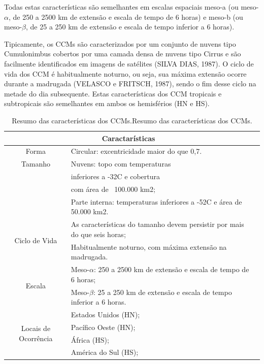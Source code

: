 Todas estas características são semelhantes em escalas espaciais meso-a (ou meso-$\alpha$, de 250 a 2500 km de extensão e escala de tempo de 6 horas) e meso-b (ou meso-$\beta$, de 25 a 250 km de extensão e escala de tempo inferior a 6 horas).

Tipicamente, os CCMs são caracterizados por um conjunto de nuvens tipo Cumulonimbus cobertos por uma camada densa de nuvens tipo Cirrus e são facilmente identificados em imagens de satélites (SILVA DIAS, 1987). O ciclo de vida dos CCM é habitualmente noturno, ou seja, sua máxima extensão ocorre durante a madrugada (VELASCO e FRITSCH, 1987), sendo o fim desse ciclo na metade do dia subsequente. Estas características dos CCM tropicais e subtropicais são semelhantes em ambos os hemisférios (HN e HS).

\begin{table}
\caption{Resumo das características dos CCMs.Resumo das características dos CCMs.}
\label{tab03}
\centering
\begin{tabular}{c|p{12cm}l}
\hline
\multicolumn{2}{c}{Caractarísticas}                                                 \\
\hline
Forma                                       & Circular: excentricidade maior do que 0,7.\\
\hline
Tamanho                                     & Nuvens: topo com temperaturas \\
                                            & inferiores a -32C e cobertura \\
                                            & com área de ~100.000 km2; \\
                                            & Parte interna: temperaturas inferiores a -52C e área de 50.000 km2.         \\
\hline
\multirow{2}{2cm}{Ciclo de Vida}            & As características do tamanho devem persistir por mais do que seis horas;   \\
                                            & Habitualmente noturno, com máxima extensão na madrugada.                \\
\hline
\multirow{2}{2cm}{Escala}                   & Meso-$\alpha$: 250 a 2500 km de extensão e escala de tempo de 6 horas;      \\
                                            & Meso-$\beta$: 25 a 250 km de extensão e escala de tempo inferior a 6 horas. \\
\hline
\multirow{4}{2cm}{Locais de Ocorrência} & Estados Unidos (HN);                  \\
                                            & Pacífico Oeste (HN);              \\
                                            & África (HS);                      \\
                                            & América do Sul (HS);              \\
\hline
\end{tabular}
\end{table}


